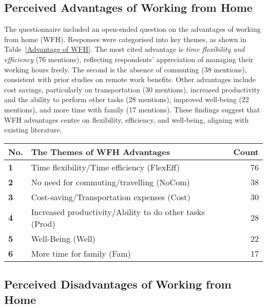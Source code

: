 \documentclass{infotel}
\begin{document}
\subsection{Perceived Advantages of Working from Home}
\label{sec:advantage-wfh}

The questionnaire included an open-ended question on the advantages of working from home (WFH). Responses were categorised into key themes, as shown in Table~\ref{Advantage of WFH}. The most cited advantage is \textit{time flexibility and efficiency} (76 mentions), reflecting respondents' appreciation of managing their working hours freely. The second is the absence of commuting (38 mentions), consistent with prior studies on remote work benefits. Other advantages include cost savings, particularly on transportation (30 mentions), increased productivity and the ability to perform other tasks (28 mentions), improved well-being (22 mentions), and more time with family (17 mentions). These findings suggest that WFH advantages centre on flexibility, efficiency, and well-being, aligning with existing literature.

\begin{table*}[ht]
	\centering
	\caption{Advantages of WFH}
	\label{Advantage of WFH}
	\begin{tabular}{p{} p{} r}
		\hline
		\textbf{No.} & \textbf{The Themes of WFH Advantages} & \textbf{Count} \\ 
		\hline
		\textbf{1} & Time flexibility/Time efficiency (FlexEff) & 76 \\ 
		\textbf{2} & No need for commuting/travelling (NoCom) & 38 \\ 
		\textbf{3} & Cost-saving/Transportation expenses (Cost) & 30 \\ 
		\textbf{4} & Increased productivity/Ability to do other tasks (Prod) & 28 \\ 
		\textbf{5} & Well-Being (Well) & 22 \\ 
		\textbf{6} & More time for family (Fam) & 17 \\ 
		\hline
	\end{tabular}
\end{table*}

\subsection{Perceived Disadvantages of Working from Home}
\label{sec:disadvantage-wfh}
\end{document}
